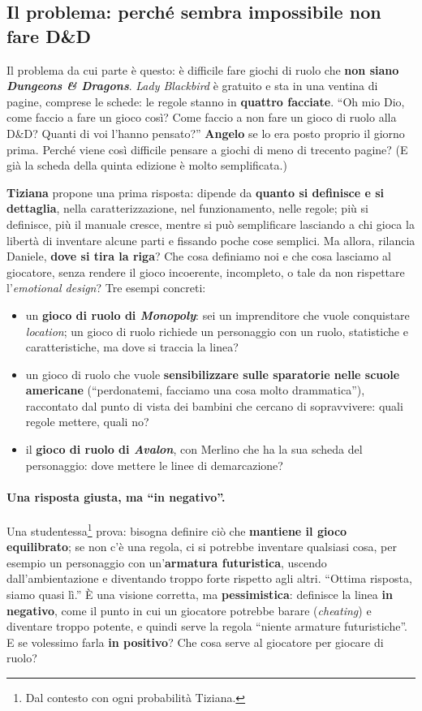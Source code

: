 \subsection{Il problema: perché sembra impossibile non fare D\&D}

Il problema da cui parte è questo: è difficile fare giochi di ruolo che \textbf{non siano
\emph{Dungeons \& Dragons}}. \emph{Lady Blackbird} è gratuito e sta in una ventina di pagine,
comprese le schede: le regole stanno in \textbf{quattro facciate}. ``Oh mio Dio, come faccio a
fare un gioco così? Come faccio a non fare un gioco di ruolo alla D\&D? Quanti di voi l'hanno
pensato?'' \textbf{Angelo} se lo era posto proprio il giorno prima. Perché viene così difficile
pensare a giochi di meno di trecento pagine? (E già la scheda della quinta edizione è molto
semplificata.)

\textbf{Tiziana} propone una prima risposta: dipende da \textbf{quanto si definisce e si
dettaglia}, nella caratterizzazione, nel funzionamento, nelle regole; più si definisce, più il
manuale cresce, mentre si può semplificare lasciando a chi gioca la libertà di inventare alcune
parti e fissando poche cose semplici. Ma allora, rilancia Daniele, \textbf{dove si tira la riga}?
Che cosa definiamo noi e che cosa lasciamo al giocatore, senza rendere il gioco incoerente,
incompleto, o tale da non rispettare l'\emph{emotional design}? Tre esempi concreti:
\begin{itemize}
  \item un \textbf{gioco di ruolo di \emph{Monopoly}}: sei un imprenditore che vuole conquistare
        \emph{location}; un gioco di ruolo richiede un personaggio con un ruolo, statistiche e
        caratteristiche, ma dove si traccia la linea?
  \item un gioco di ruolo che vuole \textbf{sensibilizzare sulle sparatorie nelle scuole
        americane} (``perdonatemi, facciamo una cosa molto drammatica''), raccontato dal punto di
        vista dei bambini che cercano di sopravvivere: quali regole mettere, quali no?
  \item il \textbf{gioco di ruolo di \emph{Avalon}}, con Merlino che ha la sua scheda del
        personaggio: dove mettere le linee di demarcazione?
\end{itemize}

\paragraph{Una risposta giusta, ma ``in negativo''.} Una studentessa\footnote{Dal contesto con ogni
probabilità Tiziana.} prova: bisogna definire ciò che \textbf{mantiene il gioco equilibrato}; se
non c'è una regola, ci si potrebbe inventare qualsiasi cosa, per esempio un personaggio con
un'\textbf{armatura futuristica}, uscendo dall'ambientazione e diventando troppo forte rispetto
agli altri. ``Ottima risposta, siamo quasi lì.'' È una visione corretta, ma
\textbf{pessimistica}: definisce la linea \textbf{in negativo}, come il punto in cui un giocatore
potrebbe barare (\emph{cheating}) e diventare troppo potente, e quindi serve la regola ``niente
armature futuristiche''. E se volessimo farla \textbf{in positivo}? Che cosa serve al giocatore per
giocare di ruolo?


